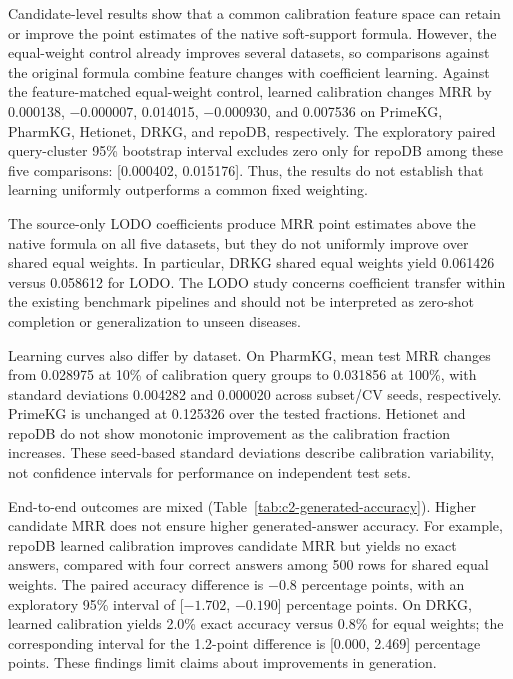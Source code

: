 Candidate-level results show that a common calibration feature space can retain
or improve the point estimates of the native soft-support formula. However,
the equal-weight control already improves several datasets, so comparisons
against the original formula combine feature changes with coefficient learning.
Against the feature-matched equal-weight control, learned calibration changes
MRR by 0.000138, $-0.000007$, 0.014015, $-0.000930$, and 0.007536 on PrimeKG,
PharmKG, Hetionet, DRKG, and repoDB, respectively. The exploratory paired
query-cluster 95\% bootstrap interval excludes zero only for repoDB among
these five comparisons: [0.000402, 0.015176]. Thus, the results do not establish
that learning uniformly outperforms a common fixed weighting.

The source-only LODO coefficients produce MRR point estimates above the native
formula on all five datasets, but they do not uniformly improve over shared
equal weights. In particular, DRKG shared equal weights yield 0.061426 versus
0.058612 for LODO. The LODO study concerns coefficient transfer within the
existing benchmark pipelines and should not be interpreted as zero-shot
completion or generalization to unseen diseases.

Learning curves also differ by dataset. On PharmKG, mean test MRR changes from
0.028975 at 10\% of calibration query groups to 0.031856 at 100\%, with standard
deviations 0.004282 and 0.000020 across subset/CV seeds, respectively. PrimeKG is
unchanged at 0.125326 over the tested fractions. Hetionet and repoDB do not show
monotonic improvement as the calibration fraction increases. These seed-based
standard deviations describe calibration variability, not confidence intervals
for performance on independent test sets.

\begin{table}[t]
\centering
\caption{Generated-answer exact accuracy (\%) in the candidate-order arm with
the full source graph and a fixed checkpoint within each dataset. Accuracy is
separate from candidate MRR and adjusted MRR.}
\label{tab:c2-generated-accuracy}

\end{table}

End-to-end outcomes are mixed (Table~\ref{tab:c2-generated-accuracy}).
Higher candidate MRR does not ensure higher generated-answer accuracy. For
example, repoDB learned calibration improves candidate MRR but yields no exact
answers, compared with four correct answers among 500 rows for shared equal
weights. The paired accuracy difference is $-0.8$ percentage points, with an
exploratory 95\% interval of [$-1.702$, $-0.190$] percentage points. On DRKG,
learned calibration yields 2.0\% exact accuracy versus 0.8\% for equal weights;
the corresponding interval for the 1.2-point difference is [0.000, 2.469]
percentage points. These findings limit claims about improvements in generation.

